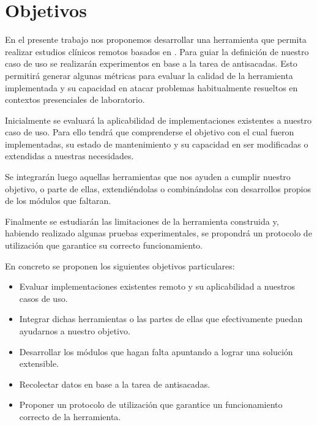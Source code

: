 \chapter{Objetivos} 

En el presente trabajo nos proponemos desarrollar una herramienta que permita
realizar estudios clínicos remotos basados en \eyetracking.  Para guiar la
definición de nuestro caso de uso se realizarán experimentos en base a la tarea
de antisacadas.  Esto permitirá generar algunas métricas para evaluar la
calidad de la herramienta implementada y su capacidad en atacar problemas
habitualmente resueltos en contextos presenciales de laboratorio.

Inicialmente se evaluará la aplicabilidad de implementaciones existentes a
nuestro caso de uso.  Para ello tendrá que comprenderse el objetivo con el cual
fueron implementadas, su estado de mantenimiento y su capacidad en ser
modificadas o extendidas a nuestras necesidades.

Se integrarán luego aquellas herramientas que nos ayuden a cumplir nuestro
objetivo, o parte de ellas, extendiéndolas o combinándolas con desarrollos
propios de los módulos que faltaran.

Finalmente se estudiarán las limitaciones de la herramienta construida y,
habiendo realizado algunas pruebas experimentales, se propondrá un protocolo de
utilización que garantice su correcto funcionamiento.

En concreto se proponen los siguientes objetivos particulares:

\begin{itemize}
  \item Evaluar implementaciones existentes \eyetracking remoto y su
    aplicabilidad a nuestros casos de uso.
  \item Integrar dichas herramientas o las partes de ellas que efectivamente
    puedan ayudarnos a nuestro objetivo.
  \item Desarrollar los módulos que hagan falta apuntando a lograr una solución
    extensible.
  \item Recolectar datos en base a la tarea de antisacadas.
  \item Proponer un protocolo de utilización que garantice un funcionamiento
    correcto de la herramienta.
\end{itemize}
